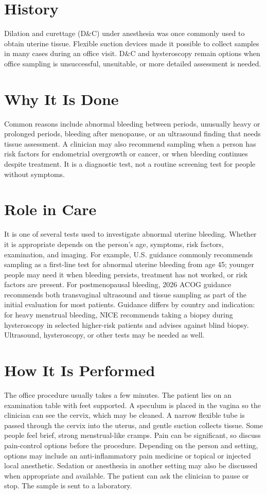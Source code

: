\section*{History}
Dilation and curettage (D\&C) under anesthesia was once commonly used to obtain uterine tissue. Flexible suction devices made it possible to collect samples in many cases during an office visit. D\&C and hysteroscopy remain options when office sampling is unsuccessful, unsuitable, or more detailed assessment is needed.

\section*{Why It Is Done}
Common reasons include abnormal bleeding between periods, unusually heavy or prolonged periods, bleeding after menopause, or an ultrasound finding that needs tissue assessment. A clinician may also recommend sampling when a person has risk factors for endometrial overgrowth or cancer, or when bleeding continues despite treatment. It is a diagnostic test, not a routine screening test for people without symptoms.

\section*{Role in Care}
It is one of several tests used to investigate abnormal uterine bleeding. Whether it is appropriate depends on the person's age, symptoms, risk factors, examination, and imaging. For example, U.S. guidance commonly recommends sampling as a first-line test for abnormal uterine bleeding from age 45; younger people may need it when bleeding persists, treatment has not worked, or risk factors are present. For postmenopausal bleeding, 2026 ACOG guidance recommends both transvaginal ultrasound and tissue sampling as part of the initial evaluation for most patients. Guidance differs by country and indication: for heavy menstrual bleeding, NICE recommends taking a biopsy during hysteroscopy in selected higher-risk patients and advises against blind biopsy. Ultrasound, hysteroscopy, or other tests may be needed as well.

\section*{How It Is Performed}
The office procedure usually takes a few minutes. The patient lies on an examination table with feet supported. A speculum is placed in the vagina so the clinician can see the cervix, which may be cleaned. A narrow flexible tube is passed through the cervix into the uterus, and gentle suction collects tissue. Some people feel brief, strong menstrual-like cramps. Pain can be significant, so discuss pain-control options before the procedure. Depending on the person and setting, options may include an anti-inflammatory pain medicine or topical or injected local anesthetic. Sedation or anesthesia in another setting may also be discussed when appropriate and available. The patient can ask the clinician to pause or stop. The sample is sent to a laboratory.

